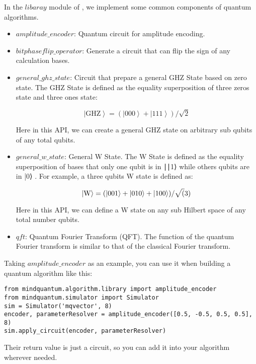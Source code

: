 In the $libaray$ module of \MindQuantum, we implement some common components of quantum algorithms.

\begin{itemize}

    \item $amplitude\_encoder$: Quantum circuit for amplitude encoding.

    \item $bitphaseflip\_operator$: Generate a circuit that can flip the sign of any calculation bases.

    \item $general\_ghz\_state$: Circuit that prepare a general GHZ State based on zero state. The GHZ State is defined as the equality superposition of three zeros state and three ones state:

    \begin{equation}
        \left|\text{GHZ}\right> = (\left|000\right> + \left|111\right>)/\sqrt{2}
    \end{equation}

    Here in this API, we can create a general GHZ state on arbitrary sub qubits of any total qubits.

    \item $general\_w\_state$: General W State. The W State is defined as the equality superposition of bases that only one qubit is in ∣∣1⟩
     while others qubits are in |0⟩
    . For example, a three qubits W state is defined as:

    \begin{equation}
        \left|\rm W\right> = (\left|001\right> + \left|010\right> + \left|100\right>)/\sqrt(3)
    \end{equation}

    Here in this API, we can define a W state on any sub Hilbert space of any total number qubits.

    \item $qft$: Quantum Fourier Transform (QFT). The function of the quantum Fourier transform is similar to that of the classical Fourier transform.
\end{itemize}

Taking $amplitude\_encoder$ as an example, you can use it when building a quantum algorithm like this:
\begin{lstlisting}
from mindquantum.algorithm.library import amplitude_encoder
from mindquantum.simulator import Simulator
sim = Simulator('mqvector', 8)
encoder, parameterResolver = amplitude_encoder([0.5, -0.5, 0.5, 0.5], 8)
sim.apply_circuit(encoder, parameterResolver)
\end{lstlisting}
Their return value is just a circuit, so you can add it into your algorithm wherever needed.